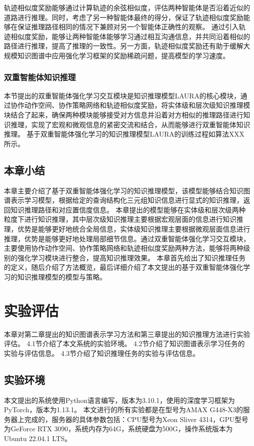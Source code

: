 \documentclass[algorithmlist, AutoFakeBold, AutoFakeSlant, figurelist, tablelist, nomlist, masters]{seuthesix}
\begin{document}
轨迹相似度奖励能够通过计算轨迹的余弦相似度，评估两种智能体是否沿着近似的道路进行推理。同时，考虑了另一种智能体最终的得分，保证了轨迹相似度奖励能够在保证推理路径相同的情况下兼顾对另一个智能体正确性的观察。
通过引入轨迹相似度奖励，能够让两种智能体能够学习通过相互沟通信息，并共同沿着相似的路径进行推理，提高了推理的一致性。另一方面，轨迹相似度奖励还有助于缓解大规模知识图谱中应用强化学习框架的奖励稀疏问题，提高模型的学习速度。

\subsection{双重智能体知识推理}
本节提出的双重智能体强化学习交互模块是知识推理模型LAURA的核心模块，通过协作动作空间、协作策略网络和轨迹相似度奖励，将实体级和层次级知识推理模块结合了起来，确保两种模块能够接受对方信息并沿着对方相似的推理路径进行知识推理，实现了宏观和微观信息的紧密交流和结合，从而能够进行双重智能体知识推理。
基于双重智能体强化学习的知识推理模型LAURA的训练过程如算法XXX所示。

\section{本章小结}
本章主要介绍了基于双重智能体强化学习的知识推理模型，该模型能够结合知识图谱表示学习模型，根据给定的查询结构化三元组知识信息进行显式的知识推理，返回知识推理路径和对应置信度信息。
本章提出的模型能够在实体级和层次级两种粒度下进行知识推理，其中层次级知识推理主要根据宏观层面的信息进行知识推理，优势是能够更好地统合全局信息，实体级知识推理主要根据微观层面信息进行推理，优势是能够更好地处理局部细节信息。通过双重智能体强化学习交互模块，主要使用协作动作空间、协作策略网络和轨迹相似度奖励两种方法，能够将两种级别的强化学习模块进行整合，提高知识推理效果。
本章首先给出了知识推理任务的定义，随后介绍了方法概览，最后详细介绍了本文提出的基于双重智能体强化学习的知识推理模型的模型与策略。


\chapter{实验评估}
本章对第二章提出的知识图谱表示学习方法和第三章提出的知识推理方法进行实验评估。
4.1节介绍了本文系统的实验环境。
4.2节介绍了知识图谱表示学习任务的实验与评估信息。
4.3节介绍了知识推理任务的实验与评估信息。

\section{实验环境}
本文提出的系统使用Python语言编写，版本为3.10.1，使用的深度学习框架为PyTorch，版本为1.13.1。
本文进行的所有实验都是在型号为AMAX G448-X3的服务器上完成的，服务器的具体参数包括：CPU型号为Xeon Sliver 4314，GPU型号为GeForce RTX 3090，系统内存为64G，系统硬盘为500G，操作系统版本为Ubuntu 22.04.1 LTS。
\end{document}
